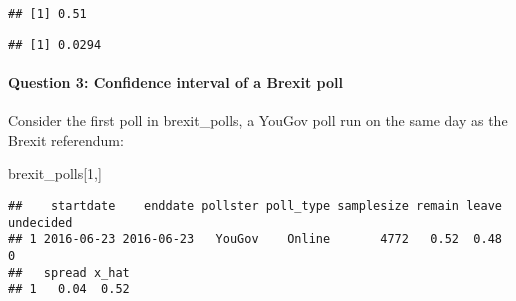 \documentclass[
]{article}
\newenvironment{Shaded}{\begin{snugshade}}{\end{snugshade}}
\newcommand{\CommentTok}[1]{\textcolor[rgb]{0.56,0.35,0.01}{\textit{#1}}}
\newcommand{\DecValTok}[1]{\textcolor[rgb]{0.00,0.00,0.81}{#1}}
\newcommand{\KeywordTok}[1]{\textcolor[rgb]{0.13,0.29,0.53}{\textbf{#1}}}
\newcommand{\NormalTok}[1]{#1}
\newcommand{\OperatorTok}[1]{\textcolor[rgb]{0.81,0.36,0.00}{\textbf{#1}}}
\newcommand{\StringTok}[1]{\textcolor[rgb]{0.31,0.60,0.02}{#1}}
\begin{document}
\begin{verbatim}
## [1] 0.51
\end{verbatim}

\begin{Shaded}
\end{Shaded}

\begin{verbatim}
## [1] 0.0294
\end{verbatim}

\hypertarget{question-3-confidence-interval-of-a-brexit-poll}{%
\paragraph{Question 3: Confidence interval of a Brexit
poll}\label{question-3-confidence-interval-of-a-brexit-poll}}

Consider the first poll in brexit\_polls, a YouGov poll run on the same
day as the Brexit referendum:

\begin{Shaded}
\begin{Highlighting}[]
\NormalTok{brexit\_polls[}\DecValTok{1}\NormalTok{,]}
\end{Highlighting}
\end{Shaded}

\begin{verbatim}
##    startdate    enddate pollster poll_type samplesize remain leave undecided
## 1 2016-06-23 2016-06-23   YouGov    Online       4772   0.52  0.48         0
##   spread x_hat
## 1   0.04  0.52
\end{verbatim}

\begin{Shaded}
\end{Shaded}
\end{document}
